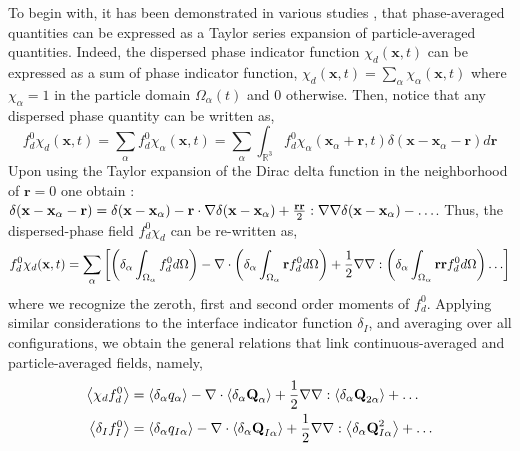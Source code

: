 To begin with, it has been demonstrated in various studies \citep{nott2011suspension,jackson1997locally,zhang1994averaged}, that phase-averaged quantities can be expressed as a Taylor series expansion of particle-averaged quantities. 
Indeed, the dispersed phase indicator function $\chi_d(\textbf{x},t)$ can be expressed as a sum of phase indicator function, $\chi_d(\textbf{x},t) = \sum_\alpha\chi_\alpha(\textbf{x},t)$ where $\chi_\alpha =1$ in the particle domain $\Omega_\alpha(t)$ and $0$ otherwise. 
Then, notice that any dispersed phase quantity can be written as, 
\begin{equation*}
    f^0_d \chi_d(\textbf{x},t)
    = \sum_\alpha f^0_d \chi_\alpha(\textbf{x},t) 
    = \sum_\alpha \int_{\mathbb{R}^3} f^0_d \chi_\alpha(\textbf{x}_\alpha+\textbf{r},t)\delta(\textbf{x}- \textbf{x}_\alpha - \textbf{r}) d\textbf{r} 
\end{equation*}
Upon using the Taylor expansion of the Dirac delta function in the neighborhood of $\textbf{r}=0$ one obtain :  $\delta(\textbf{x}- \textbf{x}_\alpha - \textbf{r}) = \delta(\textbf{x}- \textbf{x}_\alpha) - \textbf{r}\cdot\mathbf{\nabla} \delta(\textbf{x} - \textbf{x}_\alpha) + \frac{\textbf{rr}}{2}:\mathbf{\nabla}\mathbf{\nabla}\delta(\textbf{x}- \textbf{x}_\alpha) - \ldots $.
Thus, the dispersed-phase field $f_d^0\chi_d$ can be re-written as, 
\begin{equation*}
    f^0_d \chi_d(\textbf{x},t)
    = \sum_\alpha \left[
          \left(\delta_\alpha\int_{\Omega_\alpha} f^0_d d\Omega\right)
        - \mathbf{\nabla}\cdot\left(\delta_\alpha\int_{\Omega_\alpha} \textbf{r} f^0_d d\Omega\right)
        + \frac{1}{2}\mathbf{\nabla}\mathbf{\nabla} :\left(\delta_\alpha\int_{\Omega_\alpha} \textbf{rr} f^0_d d\Omega\right)
        \ldots
    \right]
\end{equation*}
where we recognize the zeroth, first and second order moments of $f_d^0$. 
Applying similar considerations to the interface indicator function $\delta_I$, and averaging over all configurations, we obtain the general relations that link continuous-averaged and particle-averaged fields, namely, 
\begin{align}
    \left<\chi_df_d^0\right> 
    &=  \left<\delta_\alpha q_\alpha\right>
        - \mathbf{\nabla}\cdot  
        \left<\delta_\alpha \textbf{Q}_\alpha\right>        
        + \frac{1}{2} \mathbf{\nabla}\mathbf{\nabla} : \left<\delta_\alpha \textbf{Q}_{2\alpha}\right>
        + \ldots  
        \nonumber\\
    \left<\delta_I f_I^0\right> 
    &=  \left<\delta_\alpha q_{I\alpha}\right>        
        - \mathbf{\nabla}\cdot \left<\delta_\alpha \textbf{Q}_{I\alpha}\right>
        + \frac{1}{2} \mathbf{\nabla}\mathbf{\nabla} : \left<\delta_\alpha \textbf{Q}_{I\alpha}^{2}\right>
        + \ldots  
    \label{eq:f_exp}
\end{align}
